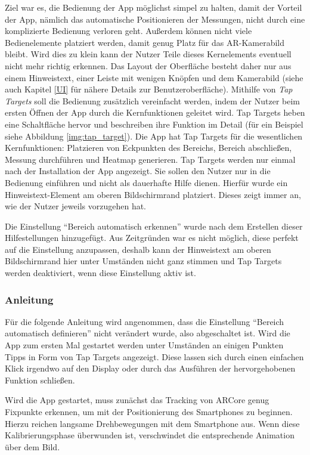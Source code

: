 \documentclass[10pt]{scrartcl}
\begin{document}
Ziel war es, die Bedienung der App möglichst simpel zu halten, damit der Vorteil der App, nämlich das automatische Positionieren der Messungen, nicht durch eine komplizierte Bedienung verloren geht. Außerdem können nicht viele Bedienelemente platziert werden, damit genug Platz für das AR-Kamerabild bleibt. Wird dies zu klein kann der Nutzer Teile dieses Kernelements eventuell nicht mehr richtig erkennen. Das Layout der Oberfläche besteht daher nur aus einem Hinweistext, einer Leiste mit wenigen Knöpfen und dem Kamerabild (siehe auch Kapitel \ref{UI} für nähere Details zur Benutzeroberfläche). Mithilfe von \textit{Tap Targets} soll die Bedienung zusätzlich vereinfacht werden, indem der Nutzer beim ersten Öffnen der App durch die Kernfunktionen geleitet wird. Tap Targets heben eine Schaltfläche hervor und beschreiben ihre Funktion im Detail (für ein Beispiel siehe Abbildung \ref{img:tap_target}). Die App hat Tap Targets für die wesentlichen Kernfunktionen: Platzieren von Eckpunkten des Bereichs, Bereich abschließen, Messung durchführen und Heatmap generieren. Tap Targets werden nur einmal nach der Installation der App angezeigt. Sie sollen den Nutzer nur in die Bedienung einführen und nicht als dauerhafte Hilfe dienen. Hierfür wurde ein Hinweistext-Element am oberen Bildschirmrand platziert. Dieses zeigt immer an, wie der Nutzer jeweils vorzugehen hat.

Die Einstellung \enquote{Bereich automatisch erkennen} wurde nach dem Erstellen dieser Hilfestellungen hinzugefügt. Aus Zeitgründen war es nicht möglich, diese perfekt auf die Einstellung anzupassen, deshalb kann der Hinweistext am oberen Bildschirmrand hier unter Umständen nicht ganz stimmen und Tap Targets werden deaktiviert, wenn diese Einstellung aktiv ist.

\subsubsection{Anleitung}
Für die folgende Anleitung wird angenommen, dass die Einstellung \enquote{Bereich automatisch definieren} nicht verändert wurde, also abgeschaltet ist. Wird die App zum ersten Mal gestartet werden unter Umständen an einigen Punkten Tipps in Form von Tap Targets angezeigt. Diese lassen sich durch einen einfachen Klick irgendwo auf den Display oder durch das Ausführen der hervorgehobenen Funktion schließen.

Wird die App gestartet, muss zunächst das Tracking von ARCore genug Fixpunkte erkennen, um mit der Positionierung des Smartphones zu beginnen. Hierzu reichen langsame Drehbewegungen mit dem Smartphone aus. Wenn diese Kalibrierungsphase überwunden ist, verschwindet die entsprechende Animation über dem Bild.
\end{document}

